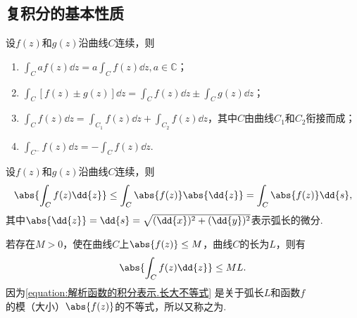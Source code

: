 \subsection{复积分的基本性质}
\begin{property}
设\(f(z)\)和\(g(z)\)沿曲线\(C\)连续，则\begin{enumerate}
\item \(\int_C a f(z) \dd{z} = a \int_C f(z) \dd{z}, a\in\mathbb{C}\)；
\item \(\int_C [f(z) \pm g(z)] \dd{z} = \int_C f(z) \dd{z} \pm \int_C g(z) \dd{z}\)；
\item \(\int_C f(z) \dd{z} = \int_{C_1} f(z) \dd{z} + \int_{C_2} f(z) \dd{z}\)，其中\(C\)由曲线\(C_1\)和\(C_2\)衔接而成；
\item \(\int_{C^-} f(z) \dd{z} = -\int_C f(z) \dd{z}\).
\end{enumerate}
\end{property}

\begin{theorem}
设\(f(z)\)和\(g(z)\)沿曲线\(C\)连续，则\begin{equation*}
\abs{\int_C f(z) \dd{z}}
\leq \int_C{\abs{f(z)}\abs{\dd{z}}}
= \int_C{\abs{f(z)}\dd{s}},
\end{equation*}其中\(\abs{\dd{z}}=\dd{s}=\sqrt{(\dd{x})^2+(\dd{y})^2}\)表示弧长的微分.
\end{theorem}

\begin{corollary}[积分估值定理]\label{theorem:解析函数的积分表示.积分估值定理}
若存在\(M > 0\)，使在曲线\(C\)上\(\abs{f(z)} \leq M\)，曲线\(C\)的长为\(L\)，则有\begin{equation}\label{equation:解析函数的积分表示.长大不等式}
\abs{\int_C f(z) \dd{z}} \leq ML.
\end{equation}\rm
因为\cref{equation:解析函数的积分表示.长大不等式} 是关于弧长\(L\)和函数\(f\)的模（大小）\(\abs{f(z)}\)的不等式，所以又称之为.
\end{corollary}
